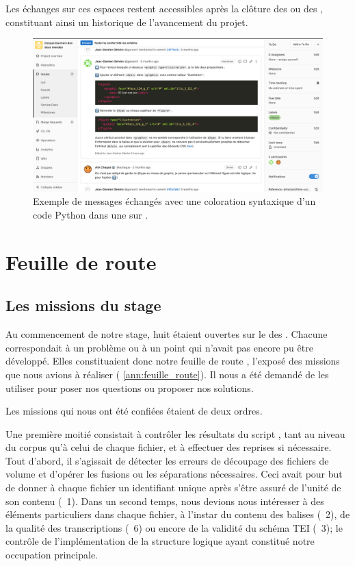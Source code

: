 Les échanges sur ces espaces restent accessibles après la clôture des \issues{} ou des \mergerequests{}, constituant ainsi un historique de l'avancement du projet.

\begin{figure}
    \centering
    \includegraphics[width=16cm]{img/gitlab.png}
    \caption{Exemple de messages échangés avec une coloration syntaxique d'un code Python dans une \issue{} sur \gitlab.}
    \label{fig:ex_gitlab}
\end{figure}

\section{Feuille de route}

\subsection{Les missions du stage}

Au commencement de notre stage, huit \issues{} étaient ouvertes sur le \gitlab{} des \odm{}. Chacune correspondait à un problème ou à un point qui n'avait pas encore pu être développé. Elles constituaient donc notre \og feuille de route \fg, \cad{} l'exposé des missions que nous avions à réaliser (\ann{} \ref{ann:feuille_route}). Il nous a été demandé de les utiliser pour poser nos questions ou proposer nos solutions.

Les missions qui nous ont été confiées étaient de deux ordres.

Une première moitié consistait à contrôler les résultats du script \lse, tant au niveau du corpus qu'à celui de chaque fichier, et à effectuer des reprises si nécessaire. Tout d'abord, il s'agissait de détecter les erreurs de découpage des fichiers de volume et d'opérer les fusions ou les séparations nécessaires. Ceci avait pour but de donner à chaque fichier un identifiant unique après s'être assuré de l'unité de son contenu (\issue{}~1). Dans un second temps, nous devions nous intéresser à des éléments particuliers dans chaque fichier, à l'instar du contenu des balises  (\issue{}~2), de la qualité des transcriptions (\issue{}~6) ou encore de la validité du schéma TEI (\issue{}~3); le contrôle de l'implémentation de la structure logique ayant constitué notre occupation principale.

